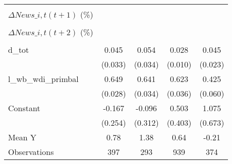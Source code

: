 {\begin{tabular}{l*{4}{c}}
                    &                     &                     &                     &                     \\
\addlinespace
$ \Delta News\_{i,t}(t+1)$ (\%)&                     &                     &                     &                     \\
                    &                     &                     &                     &                     \\
\addlinespace
$ \Delta News\_{i,t}(t+2)$ (\%)&                     &                     &                     &                     \\
                    &                     &                     &                     &                     \\
\addlinespace
d\_tot               &       0.045         &       0.054         &       0.028\sym{***}&       0.045\sym{*}  \\
                    &     (0.033)         &     (0.034)         &     (0.010)         &     (0.023)         \\
\addlinespace
l\_wb\_wdi\_primbal    &       0.649\sym{***}&       0.641\sym{***}&       0.623\sym{***}&       0.425\sym{***}\\
                    &     (0.028)         &     (0.034)         &     (0.036)         &     (0.060)         \\
\addlinespace
Constant            &      -0.167         &      -0.096         &       0.503         &       1.075         \\
                    &     (0.254)         &     (0.312)         &     (0.403)         &     (0.673)         \\
\midrule
Mean Y              &        0.78         &        1.38         &        0.64         &       -0.21         \\
Observations        &         397         &         293         &         939         &         374         \\
\bottomrule
\end{tabular}
}
